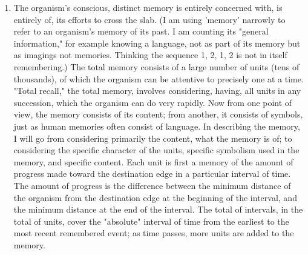 \documentclass[10pt,twoside]{memoir}
\begin{document}
\begin{enumerate}
{\begin{enumerate}
\begin{sysrules}
\begin{sysrules}
\begin{sysrules}
\begin{sysrules}
{\begin{enumerate}
\begin{enumerate}
\item The organism's conscious, distinct memory is entirely concerned 
with, is entirely of, its efforts to cross the slab. (I am using 'memory' 
narrowly to refer to an organism's memory of its past. I am counting its 
"general information," for example knowing a language, not as part of its 
memory but as imagings not memories. Thinking the sequence 1, 2, 1, 2 is 
not in itself remembering.) The total memory consists of a large number of 
units (tens of thousands), of which the organism can be attentive to precisely 
one at a time. "Total recall," the total memory, involves considering, having, 
all units in any succession, which the organism can do very rapidly. Now 
from one point of view, the memory consists of its content; from another, it 
consists of symbols, just as human memories often consist of language. In 
describing the memory, I will go from considering primarily the content, 
what the memory is of; to considering the specific character of the units, 
specific symbolism used in the memory, and specific content. Each unit is 
first a memory of the amount of progress made toward the destination edge 
in a particular interval of time. The amount of progress is the difference 
between the minimum distance of the organism from the destination edge at 
the beginning of the interval, and the minimum distance at the end of the 
interval. The total of intervals, in the total of units, cover the "absolute" 
interval of time from the earliest to the most recent remembered event; as 
time passes, more units are added to the memory. 


\end{enumerate}
\end{enumerate}}
\end{sysrules}
\end{sysrules}
\end{sysrules}
\end{sysrules}
\end{enumerate}}
\end{enumerate}
\end{document}
